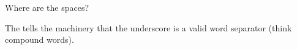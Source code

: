 \startbuffer
\nospaces\plusthree
\spacechar\underscoreasciicode
\hccode\underscoreasciicode\underscoreasciicode
Where are the spaces?
\stopbuffer

\typebuffer

The  tells the machinery that the underscore is a valid word
separator (think compound words).

\start \getbuffer \stop

\stopsectionlevel

\stopdocument

%
%
%
%

